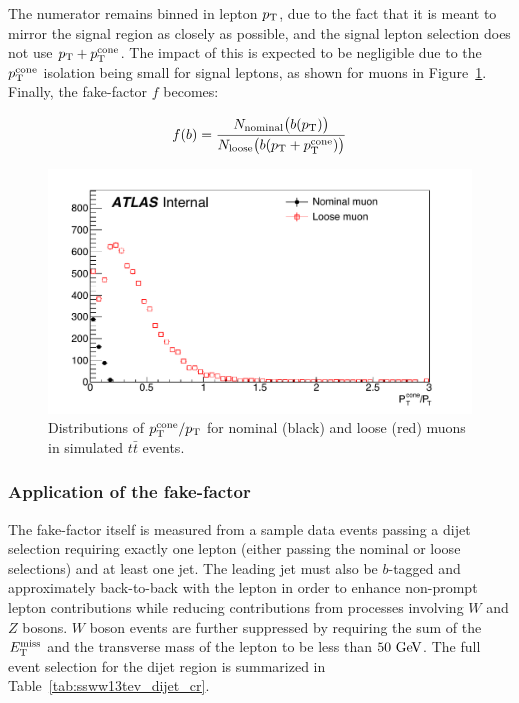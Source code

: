 The numerator remains binned in lepton $p_{\mathrm{T}}$, due to the fact that it is meant to mirror the signal region as closely as possible, and the signal lepton selection does not use $p_{\mathrm{T}}+p_{\mathrm{T}}^{\textrm{cone}}$.
The impact of this is expected to be negligible due to the $p_{\mathrm{T}}^{\textrm{cone}}$ isolation being small for signal leptons, as shown for muons in Figure~\ref{fig:ssww13tev_ff_ptcone_muons}.
Finally, the fake-factor $f$ becomes:

\begin{equation}
f(b) = \frac{N_{\textrm{nominal}}\big(b(\pt)\big)}{N_{\textrm{loose}}\big(b(\ptptcone)\big)}
\label{eq:ssww13tev_ff_ptcone_binned}
\end{equation}

\begin{figure}[htbp]
  \centering
  \includegraphics[width=.6\textwidth]{figs/ssww_13tev/backgrounds/ff/ptcone_muon_ttbar}
  \caption{Distributions of $p_{\mathrm{T}}^{\textrm{cone}}/p_{\mathrm{T}}$ for nominal (black) and loose (red) muons in simulated $t\bar{t}$ events.}
  \label{fig:ssww13tev_ff_ptcone_muons}
\end{figure}

%
\subsubsection{Application of the fake-factor}\label{ssww13tev:ff_implementation}
The fake-factor itself is measured from a sample data events passing a dijet selection requiring exactly one lepton (either passing the nominal or loose selections) and at least one jet.
The leading jet must also be $b$-tagged and approximately back-to-back with the lepton in order to enhance non-prompt lepton contributions while reducing contributions from processes involving $W$ and $Z$ bosons.
$W$ boson events are further suppressed by requiring the sum of the $E_{\mathrm{T}}^{\mathrm{miss}}$ and the transverse mass of the lepton to be less than $50\gev$.
The full event selection for the dijet region is summarized in Table~\ref{tab:ssww13tev_dijet_cr}.

